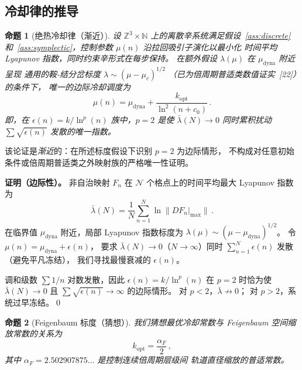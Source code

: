 \documentclass[a4paper,11pt]{article}
\theoremstyle{plain}
\newtheorem{proposition}{命题}
\newcommand{\lnq}{\ln^2}
\newcommand{\ZZ}{\mathbb{Z}}
\newcommand{\NN}{\mathbb{N}}
\begin{document}
\subsection{冷却律的推导}

\begin{proposition}[绝热冷却律（渐近）]\label{prop:cooling}
设 $\ZZ^3 \times \NN$ 上的离散辛系统满足假设~\ref{ass:discrete}
和~\ref{ass:symplectic}，控制参数 $\mu(n)$ 沿拉回吸引子演化以最小化
时间平均 Lyapunov 指数，同时约束辛形式在每步保持。
在额外假设 $\lambda(\mu)$ 在 $\mu_{\mathrm{dyna}}$ 附近呈现
通用的鞍-结分岔标度 $\lambda \sim (\mu-\mu_c)^{1/2}$
（已为倍周期普适类数值证实~[22]）的条件下，
唯一的边际冷却调度为
\begin{equation}
  \mu(n) = \mu_{\mathrm{dyna}} + \frac{k_{\mathrm{opt}}}{\lnq(n+c_0)}\,.
\end{equation}
即，在 $\epsilon(n) = k/\ln^p(n)$ 族中，$p=2$ 是使
$\bar\lambda(N)\to 0$ 同时累积扰动 $\sum\sqrt{\epsilon(n)}$ 发散的唯一指数。
\end{proposition}

该论证是\emph{渐近}的：在所述标度假设下识别 $p=2$ 为边际情形，
不构成对任意初始条件或倍周期普适类之外映射族的严格唯一性证明。

\textbf{证明（边际性）。}
非自治映射 $F_n$ 在 $\mathcal{N}$ 个格点上的时间平均最大 Lyapunov 指数为
\begin{equation}
  \bar\lambda(N) = \frac{1}{N}\sum_{n=1}^{N} \ln\|DF_n|_{\max}\|\,.
\end{equation}
在临界值 $\mu_{\mathrm{dyna}}$ 附近，局部 Lyapunov 指数标度为
$\lambda(\mu) \sim (\mu - \mu_{\mathrm{dyna}})^{1/2}$。
令 $\mu(n) = \mu_{\mathrm{dyna}} + \epsilon(n)$，
要求 $\bar\lambda(N) \to 0$（$N\to\infty$）同时
$\sum_{n=1}^N \epsilon(n)$ 发散（避免平凡冻结），
我们寻找最慢衰减的 $\epsilon(n)$。

调和级数 $\sum 1/n$ 对数发散，因此 $\epsilon(n) = k/\ln^p(n)$
在 $p=2$ 时恰为使 $\bar\lambda(N) \to 0$ 且
$\sum\sqrt{\epsilon(n)} \to \infty$ 的边际情形。
对 $p<2$，$\bar\lambda \not\to 0$；
对 $p>2$，系统过早冻结。\qed

\begin{proposition}[Feigenbaum 标度（猜想）]\label{prop:kopt}
我们猜想最优冷却常数与 Feigenbaum 空间缩放常数的关系为
\begin{equation}
  k_{\mathrm{opt}} = \frac{\alpha_F}{2}\,,
\end{equation}
其中 $\alpha_F = 2.502907875\ldots$ 是控制连续倍周期层级间
轨道直径缩放的普适常数。
\end{proposition}
\end{document}

